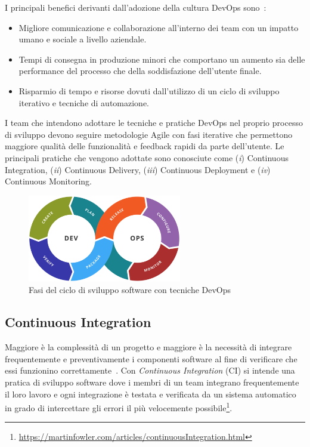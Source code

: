 I principali benefici derivanti dall'adozione della cultura DevOps sono~\cite{krief2019learning}:

\begin{itemize}
    \item Migliore comunicazione e collaborazione all'interno dei team con un impatto umano e sociale a livello aziendale.
    
    \item Tempi di consegna in produzione minori che comportano un aumento sia delle performance del processo che della soddisfazione dell'utente finale.
    
    \item Risparmio di tempo e risorse dovuti dall'utilizzo di un ciclo di sviluppo iterativo e tecniche di automazione.
\end{itemize}

I team che intendono adottare le tecniche e pratiche DevOps nel proprio processo di sviluppo devono seguire metodologie Agile con fasi iterative che permettono maggiore qualità delle funzionalità e feedback rapidi da parte dell'utente. 
Le principali pratiche che vengono adottate sono conosciute come (\textit{i}) Continuous Integration, (\textit{ii}) Continuous Delivery, (\textit{iii}) Continuous Deployment e (\textit{iv}) Continuous Monitoring.

\begin{figure}[H]
    \centering
    \includegraphics[width=0.6\textwidth]{img/Devops-toolchain.png}
    \caption{Fasi del ciclo di sviluppo software con tecniche DevOps}
\end{figure}

\subsection{Continuous Integration}
\label{ci-sec}
Maggiore è la complessità di un progetto e maggiore è la necessità di integrare frequentemente e preventivamente i componenti software al fine di verificare che essi funzionino correttamente~\cite{duvall2007continuous}.
Con \textit{Continuous Integration} (CI) si intende una pratica di sviluppo software dove i membri di un team integrano frequentemente il loro lavoro e ogni integrazione è testata e verificata da un sistema automatico in grado di intercettare gli errori il più velocemente possibile\footnote{\href{https://martinfowler.com/articles/continuousIntegration.html}{https://martinfowler.com/articles/continuousIntegration.html}}.

